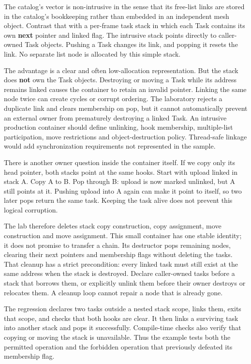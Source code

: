 The catalog's vector is non-intrusive in the sense that its free-list links are stored in the catalog's bookkeeping rather than embedded in an independent mesh object. Contrast that with a per-frame task stack in which each Task contains its own \textbf{next} pointer and linked flag. The intrusive stack points directly to caller-owned Task objects. Pushing a Task changes its link, and popping it resets the link. No separate list node is allocated by this simple stack.

The advantage is a clear and often low-allocation representation. But the stack does \textbf{not} own the Task objects. Destroying or moving a Task while its address remains linked causes the container to retain an invalid pointer. Linking the same node twice can create cycles or corrupt ordering. The laboratory rejects a duplicate link and clears membership on pop, but it cannot automatically prevent an external owner from prematurely destroying a linked Task. An intrusive production container should define unlinking, hook membership, multiple-list participation, move restrictions and object-destruction policy. Thread-safe linkage would add synchronization requirements not represented in the sample.

There is another owner question inside the container itself. If we copy only its head pointer, both stacks point at the same hooks. Start with upload linked in stack A. Copy A to B. Pop through B: upload is now marked unlinked, but A still points at it. Pushing upload into A again can make it point to itself, so two later pops return the same task. Keeping the task alive does not prevent this logical corruption.

The lab therefore deletes stack copy construction, copy assignment, move construction and move assignment. This small container has one stable identity; it does not promise to transfer a chain. Its destructor pops remaining nodes, clearing their next pointers and membership flags without deleting the tasks. That cleanup has a strict precondition: every linked task must still exist at the same address when the stack is destroyed. Declare caller-owned tasks before a stack that borrows them, or explicitly unlink them before their owner destroys or relocates them. A cleanup loop cannot repair a node that is already gone.

The regression declares two tasks outside a nested stack scope, links them, exits that scope, and checks that both hooks are clear. It then links a surviving task into another stack and pops it successfully. Compile-time checks also verify that copying or moving the stack is unavailable. Thus the example tests both the permitted operation and the forbidden operation that previously defeated its membership flag.

